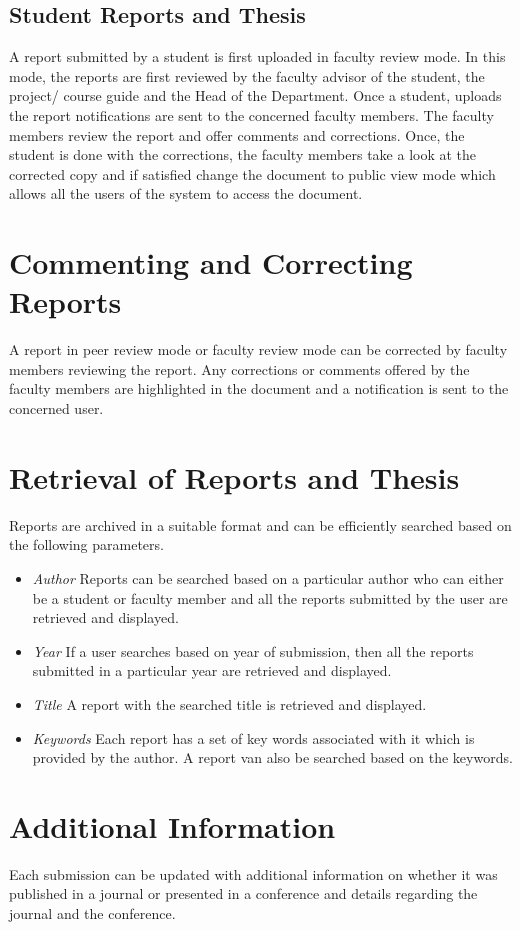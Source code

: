 \documentclass{article}
\begin{document}
\subsection{Student Reports and Thesis}

A report submitted by a student is first uploaded in faculty review mode. In this mode, the reports are first reviewed by the faculty advisor of the student, the project/ course guide and the Head of the Department. Once a student, uploads the report notifications are sent to the concerned faculty members. The faculty members review the report and offer comments and corrections. Once, the student is done with the corrections, the faculty members take a look at the corrected copy and if satisfied change the document to public view mode which allows all the users of the system to access the document.

\section{Commenting and Correcting Reports}

A report in peer review mode or faculty review mode can be corrected by faculty members reviewing the report. Any corrections or comments offered by the faculty members are highlighted in the document and a notification is sent to the concerned user.

\section{Retrieval of Reports and Thesis}
Reports are archived in a suitable format and can be efficiently searched based on the following parameters.

\begin{itemize}
\item \textit{Author} Reports can be searched based on a particular author who can either be a student or faculty member and all the reports submitted by the user are retrieved and displayed.

\item \textit{Year} If a user searches based on year of submission, then all the reports submitted in a particular year are retrieved and displayed.

\item \textit{Title} A report with the searched title is retrieved and displayed.

\item \textit{Keywords} Each report has a set of key words associated with it which is provided by the author. A report van also be searched based on the keywords. 
\end{itemize} 

\section{Additional Information}
Each submission can be updated with additional information on whether it was published in a journal or presented in a conference and details regarding the journal and the conference.
   
\end{document}
